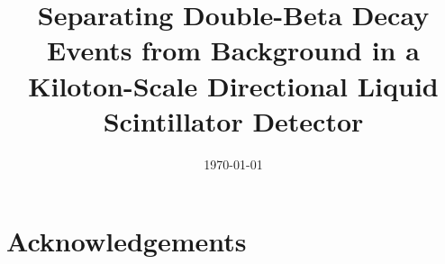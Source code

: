 



\graphicspath{{plots/}}

\linenumbers
{}

\title{Separating Double-Beta Decay Events from Background in a Kiloton-Scale Directional Liquid Scintillator Detector}


\begin{abstract}

\end{abstract}

\date{\today}

\maketitle

\newpage
\tableofcontents
\newpage

\linenumbers\relax %




\clearpage %

\clearpage %


\clearpage %


\clearpage %


\clearpage %

\section*{Acknowledgements}




%




